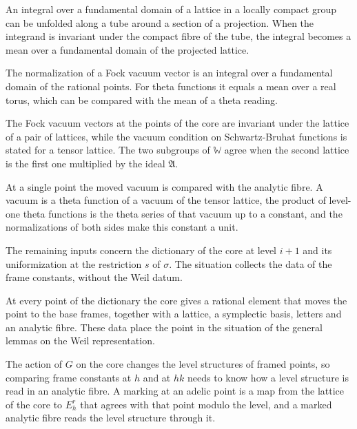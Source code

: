 An integral over a fundamental domain of a lattice in a locally compact group can be unfolded along a tube around a
section of a projection. When the integrand is invariant under the compact fibre of the tube, the integral becomes a
mean over a fundamental domain of the projected lattice.

The normalization of a Fock vacuum vector is an integral over a fundamental domain of the rational points.
For theta functions it equals a mean over a real torus, which can be compared with the mean of a theta
reading.

The Fock vacuum vectors at the points of the core are invariant under the lattice of a pair of lattices,
while the vacuum condition on Schwartz-Bruhat functions is stated for a tensor lattice. The two subgroups
of $\mathbb W$ agree when the second lattice is the first one multiplied by the ideal $\mathfrak A$.

At a single point the moved vacuum is compared with the analytic fibre. A vacuum is a theta function of a
vacuum of the tensor lattice, the product of level-one theta functions is the theta series of that vacuum
up to a constant, and the normalizations of both sides make this constant a unit.

The remaining inputs concern the dictionary of the core at level $i+1$ and its uniformization at the
restriction $s$ of $\sigma$. The situation collects the data of the frame constants, without the Weil
datum.

At every point of the dictionary the core gives a rational element that moves the point to the base
frames, together with a lattice, a symplectic basis, letters and an analytic fibre. These data place the
point in the situation of the general lemmas on the Weil representation.

The action of $G$ on the core changes the level structures of framed points, so comparing frame constants
at $h$ and at $hk$ needs to know how a level structure is read in an analytic fibre. A marking at an adelic
point is a map from the lattice of the core to $E_h^r$ that agrees with that point modulo the level, and a
marked analytic fibre reads the level structure through it.

